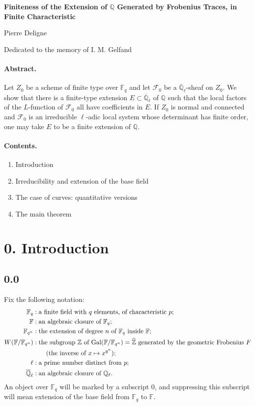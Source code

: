 \documentclass[10pt]{article}
\newcommand{\F}{\mathbb{F}}
\newcommand{\Q}{\mathbb{Q}}
\newcommand{\Z}{\mathbb{Z}}
\newcommand{\Ql}{\overline{\mathbb Q}_{\ell}}
\newcommand{\Gal}{\operatorname{Gal}}
\begin{document}
\begin{center}
{\Large\bfseries Finiteness of the Extension of $\Q$ Generated by Frobenius Traces, in Finite Characteristic}\par
\vspace{0.5em}
Pierre Deligne\par
\vspace{0.5em}
Dedicated to the memory of I. M. Gelfand
\end{center}

\paragraph{Abstract.}
Let $Z_0$ be a scheme of finite type over $\F_q$ and let $\mathcal F_0$ be a $\Ql$-sheaf on $Z_0$.
We show that there is a finite-type extension $E\subset \Ql$ of $\Q$ such that the local factors of the $L$-function of $\mathcal F_0$ all have coefficients in $E$.
If $Z_0$ is normal and connected and $\mathcal F_0$ is an irreducible $\ell$-adic local system whose determinant has finite order, one may take $E$ to be a finite extension of $\Q$.

\paragraph{Contents.}
\begin{enumerate}[label=\arabic*., start=0]
\item Introduction
\item Irreducibility and extension of the base field
\item The case of curves: quantitative versions
\item The main theorem
\end{enumerate}

\section*{0. Introduction}

\subsection*{0.0}
Fix the following notation:
\begin{align*}
\F_q&: \text{a finite field with $q$ elements, of characteristic $p$;}\\
\F&: \text{an algebraic closure of $\F_q$;}\\
\F_{q^n}&: \text{the extension of degree $n$ of $\F_q$ inside $\F$;}\\
W(\F/\F_{q^n})&: \text{the subgroup $\Z$ of $\Gal(\F/\F_{q^n})=\widehat{\Z}$ generated by the geometric Frobenius $F$}\\
&\qquad \text{(the inverse of $x\mapsto x^{q^n}$);}\notag\\
\ell&: \text{a prime number distinct from $p$;}\\
\Ql&: \text{an algebraic closure of $\mathbb Q_\ell$.}
\end{align*}
An object over $\F_q$ will be marked by a subscript $0$, and suppressing this subscript will mean extension of the base field from $\F_q$ to $\F$.
\end{document}
